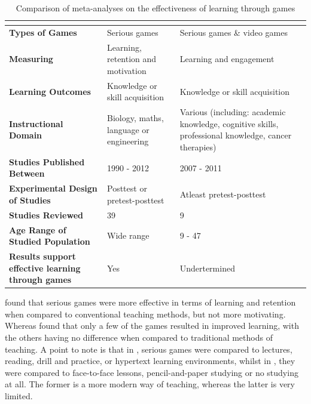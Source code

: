 \documentclass[a4paper,11.5pt]{report}
\numberwithin{figure}{section}
\numberwithin{table}{section}
\numberwithin{equation}{section}
\numberwithin{equation}{section}
\begin{document}
\begin{table}[H]
\centering
\caption{Comparison of meta-analyses on the effectiveness of learning through games}
\label{tab:effectivess learning comparison}
\begin{tabular}{p{3.4cm} | p{5cm} | p{5cm}}
       & \textbf{\citet{Pieter2013}}                  & \textbf{\citet{Girard2013}}               \\ \hline
\textbf{Types of Games}  & Serious games                & Serious games \& video games               
\\ \hline
\textbf{Measuring}   & Learning, retention and motivation                   & Learning and engagement              
\\ \hline
\textbf{Learning Outcomes}	& Knowledge or skill acquisition 	& Knowledge or skill acquisition
\\ \hline
\textbf{Instructional Domain}	& Biology, maths, language or engineering	& Various (including: academic knowledge, cognitive skills, professional knowledge, cancer therapies)
\\ \hline
\textbf{Studies Published Between}		& 1990 - 2012		& 2007 - 2011
\\ \hline
\textbf{Experimental Design of Studies}		& Posttest or pretest-posttest		& Atleast pretest-posttest
\\ \hline
\textbf{Studies Reviewed} & 39                         & 9		                 
\\ \hline
\textbf{Age Range of Studied Population} & Wide range                         & 9 - 47		                 
\\ \hline
\textbf{Results support effective learning through games} & Yes                         & Undertermined
\end{tabular}
\end{table}


\citeauthor{Pieter2013} found that serious games were more effective in terms of learning and retention when compared to conventional teaching methods, but not more motivating. Whereas \citeauthor{Girard2013} found that only a few of the games resulted in improved learning, with the others having no difference when compared to traditional methods of teaching. A point to note is that in \citet{Pieter2013}, serious games were compared to lectures, reading, drill and practice, or hypertext learning environments, whilst in \citet{Girard2013}, they were compared to face-to-face lessons, pencil-and-paper studying or no studying at all. The former is a more modern way of teaching, whereas the latter is very limited.
\end{document}
